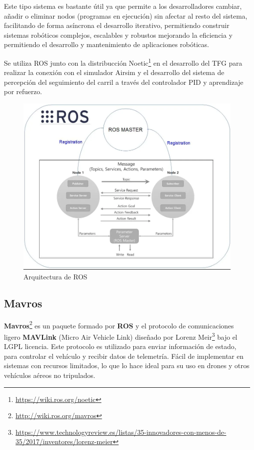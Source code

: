Este tipo sistema es bastante útil ya que permite a los desarrolladores cambiar, añadir o eliminar nodos (programas en ejecución) sin afectar al resto del sistema, facilitando de forma asíncrona
el desarrollo iterativo, permitiendo construir sistemas robóticos complejos, escalables y robustos mejorando la eficiencia y permitiendo el desarrollo y mantenimiento de aplicaciones
robóticas. 

Se utiliza ROS junto con la distribucción Noetic\footnote{\url{https://wiki.ros.org/noetic}} en el desarrollo del TFG para realizar la conexión con el simulador Airsim y el desarrollo del sistema de percepción del seguimiento del carril a través del controlador PID y 
aprendizaje por refuerzo. 


\begin{figure} [H]
    \begin{center}
      \includegraphics[scale=0.4]{figs/Plataformas_Desarollo/arq_ros.png}
    \end{center}
    \caption{Arquitectura de ROS}
    \label{fig:ArqROS}
  \end{figure}
\subsection{Mavros}
\vspace{-1.5em}
\label{sec:mavros}

\textbf{Mavros}\footnote{\url{http://wiki.ros.org/mavros}} es un paquete formado por \textbf{ROS} y el protocolo de comunicaciones ligero \textbf{MAVLink} (Micro Air Vehicle Link) diseñado por Lorenz Meir\footnote{\url{https://www.technologyreview.es/listas/35-innovadores-con-menos-de-35/2017/inventores/lorenz-meier}} bajo el LGPL licencia. Este protocolo es utilizado para enviar información de estado,
para controlar el vehículo y recibir datos de telemetría. Fácil de implementar en sistemas con recursos limitados, 
lo que lo hace ideal para su uso en drones y otros vehículos aéreos no tripulados.

